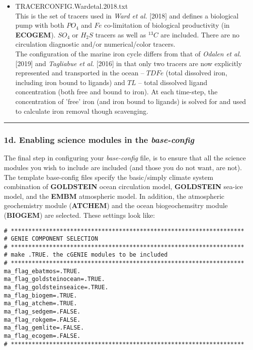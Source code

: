 \documentclass[11pt,fleqn]{book} %
\begin{document}
\begin{itemize}[noitemsep]
\vspace{2mm}
\item \textsf{\small TRACERCONFIG.Wardetal.2018.txt}
\vspace{1mm}
\\This is the set of tracers used in \textit{Ward et al.} [2018] and defines a biological pump with both \(PO_{4}\) and \(Fe\) co-limitation of biological productivity (in \textbf{ECOGEM}). \(SO_{4}\) or \(H_{2}S\) tracers as well as \(^{13}C\) are included. There are no circulation diagnostic and/or numerical/color tracers.
\\The configuration of the marine iron cycle differs from that of \textit{Odalen et al.} [2019] and \textit{Tagliabue et al.} [2016] in that only two tracers are now explicitly represented and transported in the ocean -- \(TDFe\) (total dissolved iron, including iron bound to ligands) and \(TL\) -- total dissolved ligand concentration (both free and bound to iron). At each time-step, the concentration of 'free' iron (and iron bound to ligands) is solved for and used to calculate iron removal though scavenging.

\end{itemize}

%
\noindent\rule{4cm}{0.5pt}
\subsubsection{1d. Enabling science modules in the \textit{base-config}}

The final step in configuring your \textit{base-config} file, is to ensure that all the science modules you wish to include are included (and those you do not want, are not). The template base-config files specify the basic/simply climate system combination of \textbf{GOLDSTEIN} ocean circulation model, \textbf{GOLDSTEIN} sea-ice model, and the \textbf{EMBM} atmospheric model. In addition, the atmospheric geochemistry module (\textbf{ATCHEM}) and the ocean biogeochemsitry module (\textbf{BIOGEM}) are selected. These settings look like:

\footnotesize\vspace{-2pt}\begin{verbatim}
# *******************************************************************
# GENIE COMPONENT SELECTION
# *******************************************************************
# make .TRUE. the cGENIE modules to be included
# *******************************************************************
ma_flag_ebatmos=.TRUE.
ma_flag_goldsteinocean=.TRUE.
ma_flag_goldsteinseaice=.TRUE.
ma_flag_biogem=.TRUE.
ma_flag_atchem=.TRUE.
ma_flag_sedgem=.FALSE.
ma_flag_rokgem=.FALSE.
ma_flag_gemlite=.FALSE.
ma_flag_ecogem=.FALSE.
# *******************************************************************
\end{verbatim}\vspace{-2pt}\normalsize
\end{document}
